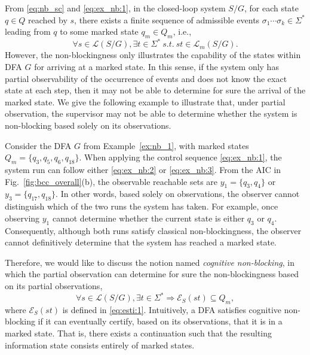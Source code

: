 \documentclass[journal,twoside,web]{ieeecolor}
\begin{document}
From \eqref{eq:nb_sc} and \eqref{eq:ex_nb:1}, in the closed-loop system $S/G$, for each state $q \in Q$ reached by $s$, there exists a finite sequence of admissible events $\sigma_1 \cdots \sigma_k \in \Sigma^*$ 
leading from $q$ to some marked state $q_m \in Q_m$, i.e.,
\begin{equation}
    \forall s \in \mathcal{L}(S/G), \exists t \in \Sigma^* \ s.t. \ st \in \mathcal{L}_m(S/G).
    \label{eq:nb_sc:2}
\end{equation}
%
However, the non-blockingness only illustrates the capability of the states within DFA $G$ for arriving at a marked state.
In this sense, if the system only has partial observability of the occurrence of events and does not know the exact state at each step, then it may not be able to determine for sure the arrival of the marked state.
%
We give the following example to illustrate that, under partial observation, the supervisor may not be able to determine whether the system is non-blocking based solely on its observations.
%
\begin{example}\label{ex:cnb_1}
    Consider the DFA $G$ from Example~\ref{ex:nb_1}, with marked states $Q_m = \{ q_3, q_5, q_6, q_{18} \}$. 
    When applying the control sequence \eqref{eq:ex_nb:1}, the system run can follow either \eqref{eq:ex_nb:2} or \eqref{eq:ex_nb:3}. 
    From the AIC in Fig.~\ref{fig:bcc_overall}(b), the observable reachable sets are $y_1 = \{ q_3, q_4 \}$ or $y_3 = \{ q_{17}, q_{18} \}$. 
    In other words, based solely on observations, the observer cannot distinguish which of the two runs the system has taken.
    For example, once observing $y_1$ cannot determine whether the current state is either $q_3$ or $q_4$.
    Consequently, although both runs satisfy classical non-blockingness, the observer cannot definitively determine that the system has reached a marked state.
\end{example}
%
Therefore, we would like to discuss the notion named \emph{cognitive non-blocking}, in which the partial observation can determine for sure the non-blockingness based on its partial observations, 
\begin{equation}
    \forall s \in \mathcal{L}(S/G), \exists t \in \Sigma^* \Rightarrow \mathcal{E}_S(st) \subseteq Q_m,
\end{equation}
%
where $\mathcal{E}_S(st)$ is defined in \eqref{eq:esti:1}.
Intuitively, a DFA satisfies cognitive non-blocking if it can eventually certify, based on its observations, that it is in a marked state. 
That is, there exists a continuation such that the resulting information state consists entirely of marked states.
\end{document}
